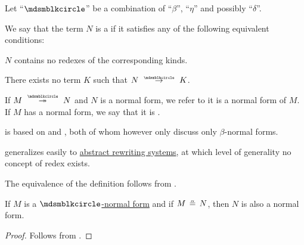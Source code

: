 \begin{definition}\label{def:lambda_term_normal_form}\mimprovised
  Let \enquote{\( {\Anon} \)} be a combination of \enquote{\( \beta \)}, \enquote{\( \eta \)} and possibly \enquote{\( \delta \)}.

  We say that the term \( N \) is a  if it satisfies any of the following equivalent conditions:
  \begin{thmenum}
     \( N \) contains no redexes of the corresponding kinds.

     There exists no term \( K \) such that \( N \pred K \).
  \end{thmenum}

  If \( M \pred* N \) and \( N \) is a normal form, we refer to it is a normal form of \( M \). If \( M \) has a normal form, we say that it is .
\end{definition}
\begin{comments}
  \item {} is based on  and , both of whom however only discuss only \( \beta \)-normal forms.

  \item {} generalizes easily to \hyperref[def:rewriting_system]{abstract rewriting systems}, at which level of generality no concept of redex exists.
\end{comments}
\begin{defproof}
  The equivalence of the definition follows from .
\end{defproof}

\begin{proposition}\label{thm:alpha_equivalent_normal_form}
  If \( M \) is a \hyperref[def:lambda_term_normal_form]{\( \Anon \)-normal form} and if \( M \aequiv N \), then \( N \) is also a normal form.
\end{proposition}
\begin{proof}
  Follows from .
\end{proof}

